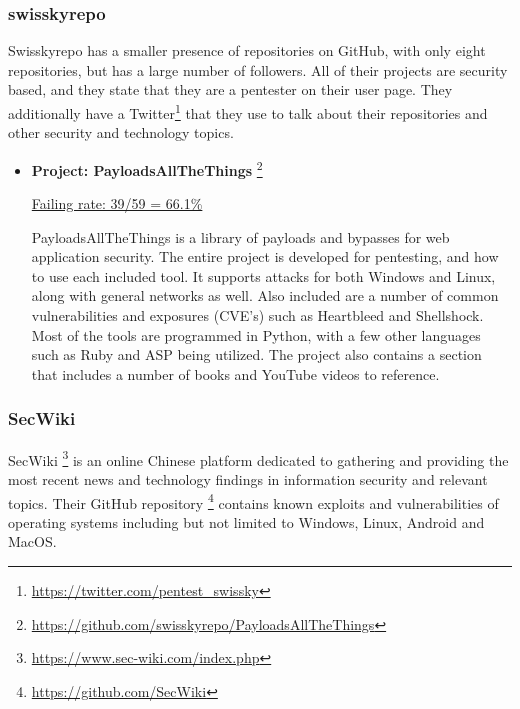 \documentclass[]{acmart}
\begin{document}
\subsubsection{swisskyrepo}
Swisskyrepo has a smaller presence of repositories on GitHub, with only eight repositories, but has a large number of followers. All of their projects are security based, and they state that they are a pentester on their user page. They additionally have a Twitter\footnote{\url{https://twitter.com/pentest_swissky}} that they use to talk about their repositories and other security and technology topics. 
\begin{itemize}
    \item { \bf Project: PayloadsAllTheThings } \footnote{\url{https://github.com/swisskyrepo/PayloadsAllTheThings}} 
    
    \underline{ Failing rate: 39/59 = 66.1\% }
    
    PayloadsAllTheThings is a library of payloads and bypasses for web application security. The entire project is developed for pentesting, and how to use each included tool. It supports attacks for both Windows and Linux, along with general networks as well. Also included are a number of common vulnerabilities and exposures (CVE's) such as Heartbleed and Shellshock. Most of the tools are programmed in Python, with a few other languages such as Ruby and ASP being utilized. The project also contains a section that includes a number of books and YouTube videos to reference.
\end{itemize}
\subsubsection{SecWiki}
SecWiki \footnote{\url{https://www.sec-wiki.com/index.php}} is an online Chinese platform dedicated to gathering and providing the most recent news and technology findings in information security and relevant topics. Their GitHub repository \footnote{\url{https://github.com/SecWiki}} contains known exploits and vulnerabilities of operating systems including but not limited to Windows, Linux, Android and MacOS. 
\end{document}
